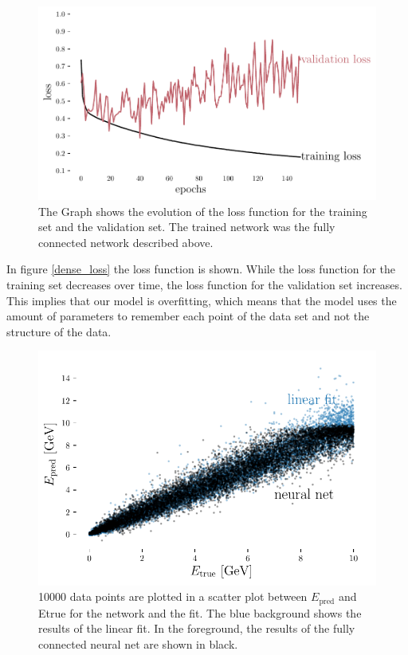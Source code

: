 \documentclass[12pt, a4paper]{thesis}
\begin{document}
\begin{figure}[htbp]
\centering
\includegraphics[width=.9\linewidth]{../images/dense_loss.pdf}
\caption{\label{fig:orge8cf1b9}
The Graph shows the evolution of the loss function for the training set and the validation set. The trained network was the fully connected network described above.}
\end{figure}

In figure \ref{dense_loss} the loss function is shown. While the loss
function for the training set decreases over time, the loss function for the
validation set increases. This implies that our model is overfitting,
which means that the model uses the amount of parameters to remember
each point of the data set and not the structure of the data.

\begin{figure}[htbp]
\centering
\includegraphics[width=.9\linewidth]{../images/dense_scatter.pdf}
\caption{\label{fig:org886b7bf}
10000 data points are plotted in a scatter plot between \(E_\text{pred}\) and Etrue for the network and the fit. The blue background shows the results of the linear fit. In the foreground, the results of the fully connected neural net are shown in black.}
\end{figure} 
\end{document}

